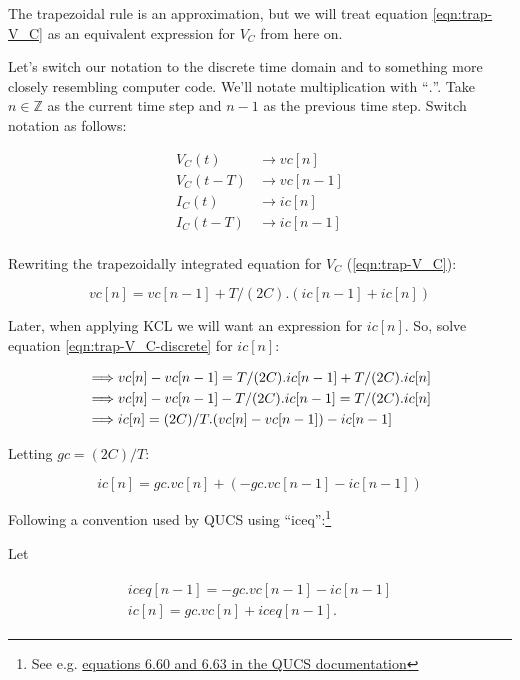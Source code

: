 \documentclass{article}
\begin{document}
The trapezoidal rule is an approximation, but we will treat equation \ref{eqn:trap-V_C} as an equivalent expression for $V_C$ from here on.

Let's switch our notation to the discrete time domain and to something more closely resembling computer code. We'll notate multiplication with ``$.$''.
Take $n \in \mathbb{Z}$ as the current time step and $n-1$ as the previous time step.
Switch notation as follows:

\begin{align*}
V_C(t) &\to vc[n] \\
V_C(t-T) &\to vc[n-1] \\
I_C(t) &\to ic[n] \\
I_C(t-T) &\to ic[n-1] \\
\end{align*}

Rewriting the trapezoidally integrated equation for $V_C$ (\ref{eqn:trap-V_C}):

\begin{equation}
\label{eqn:trap-V_C-discrete}
vc[n] = vc[n-1] + T/(2C) . ( ic[n-1] + ic[n] )
\end{equation}

Later, when applying KCL we will want an expression for $ic[n]$. So,
	solve equation \ref{eqn:trap-V_C-discrete} for $ic[n]$:

\begin{align}
\implies &vc[n] - vc[n-1] = T/(2C) . ic[n-1] + T/(2C) . ic[n] \notag\\
\implies &vc[n] - vc[n-1] - T/(2C) . ic[n-1] = T/(2C) . ic[n] \notag\\
\implies &ic[n] = (2C)/T . (vc[n] - vc[n-1]) - ic[n-1]
\end{align}

Letting $gc = (2C)/T$:

\begin{equation}
ic[n] = gc . vc[n] + (- gc . vc[n-1] - ic[n-1])
\end{equation}

Following a convention used by QUCS using ``iceq'':\footnote{
	See e.g. \href{http://qucs.sourceforge.net/tech/node26.html#SECTION00731000000000000000}{equations 6.60 and 6.63 in the QUCS documentation}}

Let

\begin{eqnarray} \begin{array}{l}
iceq[n-1] = - gc . vc[n-1] - ic[n-1]\\
ic[n] = gc . vc[n] + iceq[n-1].
\end{array} \end{eqnarray}
\end{document}
